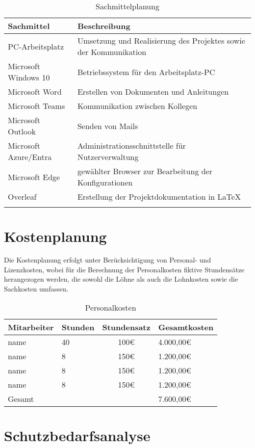 \begin{longtable}{|l|p{10cm}|}
\hline
\textbf{Sachmittel}         & \textbf{Beschreibung}                                            \\ \hline
PC-Arbeitsplatz             & Umsetzung und Realisierung des Projektes sowie der Kommunikation \\ \hline
Microsoft Windows 10        & Betriebssystem für den Arbeitsplatz-PC                           \\ \hline
Microsoft Word              & Erstellen von Dokumenten und Anleitungen                         \\ \hline
Microsoft Teams             & Kommunikation zwischen Kollegen                                  \\ \hline
Microsoft Outlook           & Senden von Mails                                                 \\ \hline
Microsoft Azure/Entra       & Administrationsschnittstelle für Nutzerverwaltung                \\ \hline
Microsoft Edge              & gewählter Browser zur Bearbeitung der Konfigurationen            \\ \hline
Overleaf                    & Erstellung der Projektdokumentation in \LaTeX                    \\ \hline
\caption{Sachmittelplanung} \\
\end{longtable}

\section{Kostenplanung}
Die Kostenplanung erfolgt unter Berücksichtigung von Personal- und Lizenzkosten, wobei für die Berechnung der Personalkosten fiktive Stundensätze herangezogen werden, die sowohl die Löhne als auch die Lohnkosten sowie die Sachkosten umfassen.

\begin{table}[h!]
\centering
\begin{tabular}{|l|l|c|l|}
\hline
\textbf{Mitarbeiter} & \textbf{Stunden} & \textbf{Stundensatz} & \textbf{Gesamtkosten} \\ \hline
name   & 40     & 100€         & 4.000,00€   \\ \hline
name & 8      & 150€         & 1.200,00€   \\ \hline
name     & 8      & 150€         & 1.200,00€   \\ \hline
name            & 8      & 150€         & 1.200,00€   \\ \hline
Gesamt                 &        &              & 7.600,00€   \\ \hline
\end{tabular}
\caption{Personalkosten}
\label{tab:Personalkosten}
\end{table}


\section {Schutzbedarfsanalyse}
\lipsum[1]